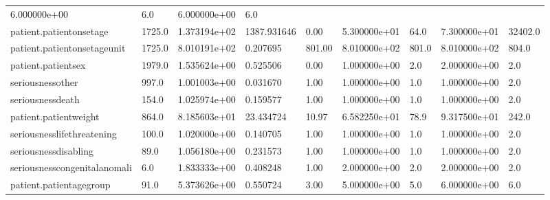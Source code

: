 \documentclass[
  letterpaper,
  DIV=11,
  numbers=noendperiod]{scrartcl}
\begin{document}
\begin{longtable}[]{@{}lllllllll@{}}
6.000000e+00 & 6.0 & 6.000000e+00 & 6.0 \\
patient.patientonsetage & 1725.0 & 1.373194e+02 & 1387.931646 & 0.00 &
5.300000e+01 & 64.0 & 7.300000e+01 & 32402.0 \\
patient.patientonsetageunit & 1725.0 & 8.010191e+02 & 0.207695 & 801.00
& 8.010000e+02 & 801.0 & 8.010000e+02 & 804.0 \\
patient.patientsex & 1979.0 & 1.535624e+00 & 0.525506 & 0.00 &
1.000000e+00 & 2.0 & 2.000000e+00 & 2.0 \\
seriousnessother & 997.0 & 1.001003e+00 & 0.031670 & 1.00 & 1.000000e+00
& 1.0 & 1.000000e+00 & 2.0 \\
seriousnessdeath & 154.0 & 1.025974e+00 & 0.159577 & 1.00 & 1.000000e+00
& 1.0 & 1.000000e+00 & 2.0 \\
patient.patientweight & 864.0 & 8.185603e+01 & 23.434724 & 10.97 &
6.582250e+01 & 78.9 & 9.317500e+01 & 242.0 \\
seriousnesslifethreatening & 100.0 & 1.020000e+00 & 0.140705 & 1.00 &
1.000000e+00 & 1.0 & 1.000000e+00 & 2.0 \\
seriousnessdisabling & 89.0 & 1.056180e+00 & 0.231573 & 1.00 &
1.000000e+00 & 1.0 & 1.000000e+00 & 2.0 \\
seriousnesscongenitalanomali & 6.0 & 1.833333e+00 & 0.408248 & 1.00 &
2.000000e+00 & 2.0 & 2.000000e+00 & 2.0 \\
patient.patientagegroup & 91.0 & 5.373626e+00 & 0.550724 & 3.00 &
5.000000e+00 & 5.0 & 6.000000e+00 & 6.0 \\
\end{longtable}
\end{document}
